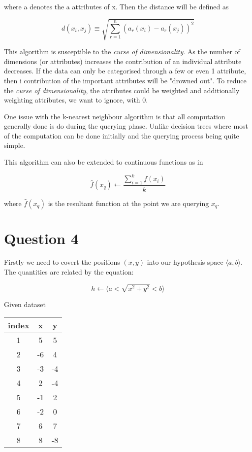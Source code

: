 \documentclass[10pt,a4paper]{article}
\begin{document}
where a denotes the a attributes of x. Then the distance will be defined as 

\begin{equation}
d(x_i,x_j) \equiv \sqrt{\sum_{r=1}^n(a_r(x_i) - a_r(x_j))^2}
\end{equation}

\citep{Michell2009}

This algorithm is susceptible to the \emph{curse of dimensionality}. As the number of dimensions (or attributes) increases the contribution of an individual attribute decreases. If the data can only be categorised through a few or even 1 attribute, then i contribution of the important attributes will be "drowned out". \citep{Murphy} To reduce the \emph{curse of dimensionality}, the attributes could be weighted and additionally weighting attributes, we want to ignore, with 0.\citep{Michell2009}

One issue with the k-nearest neighbour algorithm is that all computation generally done is do during the querying phase. Unlike decision trees where most of the computation can be done initially and the querying process being quite simple. \citep{Michell2009}

This algorithm can also be extended to continuous functions as in

\begin{equation}
\hat{f}(x_q) \leftarrow \frac{\sum_{i=1}^k f(x_i)}{k}
\end{equation}

where $\hat{f}(x_q)$ is the resultant function at the point we are querying $x_q$.

\section{Question 4}

Firstly we need to covert the positions $(x,y)$ into our hypothesis space $\langle a,b \rangle$. The quantities are related by the equation: 

\begin{equation}
h \leftarrow \langle a < \sqrt{x^2 + y^2} < b \rangle
\end{equation}
 
Given dataset

\begin{tabular}{|c|c|c|}
\hline
index & x & y \\
\hline
1 & 5 & 5 \\
2 & -6 & 4 \\
3 & -3 & -4 \\
4 & 2  & -4 \\
5 & -1 & 2 \\
6 & -2 & 0 \\
7 & 6  & 7 \\
8 & 8  & -8 \\
\hline
\end{tabular} 
 
\end{document}
